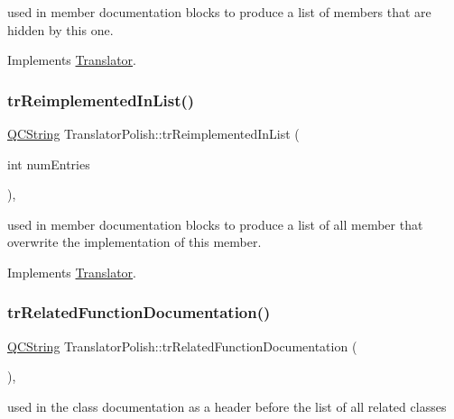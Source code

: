 used in member documentation blocks to produce a list of members that are hidden by this one. 

Implements \mbox{\hyperlink{class_translator}{Translator}}.

\mbox{\label{class_translator_polish_ab10c7bca3bfb29ce5fb16265b86afdef}} 
\subsubsection{\texorpdfstring{trReimplementedInList()}{trReimplementedInList()}}
{\footnotesize\ttfamily \mbox{\hyperlink{class_q_c_string}{Q\+C\+String}} Translator\+Polish\+::tr\+Reimplemented\+In\+List (\begin{DoxyParamCaption}\item[{int}]{num\+Entries }\end{DoxyParamCaption})\hspace{0.3cm}{\ttfamily [inline]}, {\ttfamily [virtual]}}

used in member documentation blocks to produce a list of all member that overwrite the implementation of this member. 

Implements \mbox{\hyperlink{class_translator}{Translator}}.

\mbox{\label{class_translator_polish_a7fa3c196cf1611345ada1a3f7a2f523f}} 
\subsubsection{\texorpdfstring{trRelatedFunctionDocumentation()}{trRelatedFunctionDocumentation()}}
{\footnotesize\ttfamily \mbox{\hyperlink{class_q_c_string}{Q\+C\+String}} Translator\+Polish\+::tr\+Related\+Function\+Documentation (\begin{DoxyParamCaption}{ }\end{DoxyParamCaption})\hspace{0.3cm}{\ttfamily [inline]}, {\ttfamily [virtual]}}

used in the class documentation as a header before the list of all related classes 


